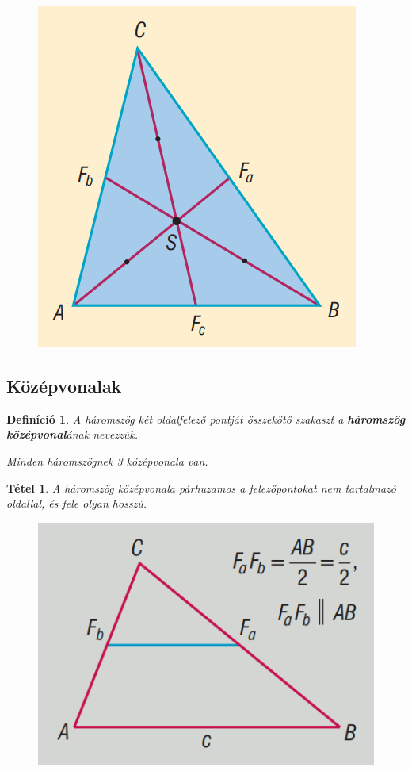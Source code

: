 \documentclass[12pt,a4paper]{article}
\newtheorem{theorem}{Tétel} [section]
\newtheorem{definition}{Definíció} [section]
\begin{document}
\begin{figure}[h]
\centering
\includegraphics[scale=0.3]{geometry/sulypont}
\end{figure}

\subsection{Középvonalak}

\begin{definition}
A háromszög két oldalfelező pontját összekötő szakaszt a \textbf{háromszög középvonal}ának nevezzük.

Minden háromszögnek 3 középvonala van.
\end{definition}

\begin{theorem}
A háromszög középvonala párhuzamos a felezőpontokat nem tartalmazó oldallal, és fele olyan hosszú.
\end{theorem}
\begin{figure}[h]
\centering
\includegraphics[scale=0.3]{geometry/kozepvonal}
\end{figure}
\newpage
\end{document}
